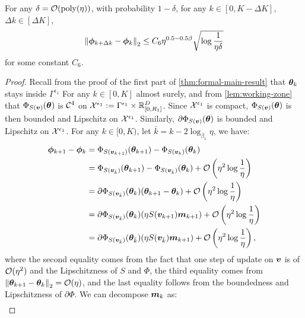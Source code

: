 \begin{lemma}\label{lem:proj-movement}
    For any $\delta = \mathcal{O}(\mathrm{poly}(\eta))$, with probability $1 - \delta$, for any $k \in [0, K - \Delta K]$, $\Delta k \in [\Delta K]$, $$\left\|{\bm{\phi}}_{k+\Delta k} - {\bm{\phi}}_k\right\|_2 \leq C_6 \eta^{0.5-0.5\beta} \sqrt{\log \frac{1}{\eta\delta}}$$
    for some constant $C_6$.
\end{lemma}
\begin{proof}
    Recall from the proof of the first part of \cref{thm:formal-main-result} that ${\bm{\theta}}_k$ stays inside $\Gamma^{\epsilon_1}$ For any $k \in [0, K]$ almost surely, and from \cref{lem:working-zone} that $\Phi_{S({\bm{v}})}({\bm{\theta}})$ is $\mathcal{C}^4$ on $\mathcal{X}^{\epsilon_1} := \Gamma^{\epsilon_1} \times \mathbb{R}_{[0,R_1]}^D$. Since $\mathcal{X}^{\epsilon_1}$ is compact, $\Phi_{S({\bm{v}})}({\bm{\theta}})$ is then bounded and Lipschitz on $\mathcal{X}^{\epsilon_1}$. Similarly, $\partial \Phi_{S({\bm{v}})}({\bm{\theta}})$ is bounded and Lipschitz on $\mathcal{X}^{\epsilon_1}$. For any $k \in [0, K)$, let $\bar{k} = k - 2\log_{\beta_1}{\eta}$, we have: \begin{align*}
        {\bm{\phi}}_{k+1} - {\bm{\phi}}_{k} &= \Phi_{S({\bm{v}}_{k+1})}({\bm{\theta}}_{k+1}) - \Phi_{S({\bm{v}}_k)}({\bm{\theta}}_k) \\
        &= \Phi_{S({\bm{v}}_{\bar{k}})}({\bm{\theta}}_{k+1}) - \Phi_{S({\bm{v}}_{\bar{k}})}({\bm{\theta}}_k) + \mathcal{O}\left(\eta^2\log \frac{1}{\eta}\right) \\
        &= \partial\Phi_{S({\bm{v}}_{\bar{k}})}({\bm{\theta}}_k)({\bm{\theta}}_{k+1} - {\bm{\theta}}_k) + \mathcal{O}\left(\eta^2\log \frac{1}{\eta}\right) \\
        &= \partial\Phi_{S({\bm{v}}_{\bar{k}})}({\bm{\theta}}_k)(\eta S({\bm{v}}_{k+1}){\bm{m}}_{k+1}) + \mathcal{O}\left(\eta^2\log \frac{1}{\eta}\right) \\
        &= \partial\Phi_{S({\bm{v}}_{\bar{k}})}({\bm{\theta}}_{\bar{k}})(\eta S({\bm{v}}_{\bar{k}}){\bm{m}}_{k+1}) + \mathcal{O}\left(\eta^2\log \frac{1}{\eta}\right),
    \end{align*}
    where the second equality comes from the fact that one step of update on ${\bm{v}}$ is of $\mathcal{O}(\eta^2)$ and the Lipschitzness of $S$ and $\Phi$, the third equality comes from $\left\|{\bm{\theta}}_{k+1}-{\bm{\theta}}_k\right\|_2 = \mathcal{O}(\eta)$, and the last equality follows from the boundedness and Lipschitzness of $\partial \Phi$. We can decompose ${\bm{m}}_k$ as: \begin{align*}

\end{align*}
\end{proof}
